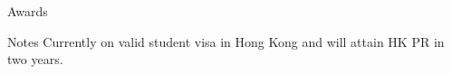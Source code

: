 \documentclass[caps, english]{financecv}
\begin{document}
\begin{cvsection}{Awards}
\end{cvsection}

\begin{cvsection}{Notes}
    Currently on valid student visa in Hong Kong and will attain HK PR in two years.
\end{cvsection}
\end{document}
